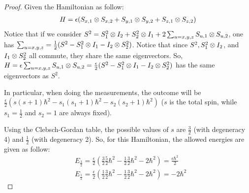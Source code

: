 \documentclass{article}
\begin{document}
\begin{proof}
    Given the Hamiltonian as follow:
    \begin{align}
        H=\epsilon(S_{x,1}\otimes S_{x,2}+S_{y,1}\otimes S_{y,2}+S_{z,1}\otimes S_{z,2})
    \end{align}
    Notice that if we consider $S^2 = S_1^2\otimes I_2+S_2^2\otimes I_1 + 2\sum_{u=x,y,z}S_{u,1}\otimes S_{u,2}$, one has $\sum_{u=x,y,z} = \frac{1}{2}(S^2-S_1^2\otimes I_1-I_2\otimes S_2^2)$. Notice that since $S^2, S_1^2\otimes I_2$, and $I_1\otimes S_2^2$ all commute, they share the same eigenvectors. So, $H = \epsilon\sum_{u=x,y,z}S_{u,1}\otimes S_{u,2} = \frac{\epsilon}{2}(S^2-S_1^2\otimes I_1-I_2\otimes S_2^2)$ has the same eigenvectors as $S^2$.

    In particular, when doing the measurements, the outcome will be $\frac{\epsilon}{2}(s(s+1)\hbar^2 - s_1(s_1+1)\hbar^2-s_2(s_2+1)\hbar^2)$ ($s$ is the total spin, while $s_1=\frac{1}{2}$ and $s_2=1$ are always fixed).

    Using the Clebsch-Gordan table, the possible values of $s$ are $\frac{3}{2}$ (with degeneracy 4) and $\frac{1}{2}$ (with degeneracy 2). So, for this Hamiltonian, the allowed energies are given as follow:
    \begin{align}
        &E_{\frac{3}{2}} = \frac{\epsilon}{2}\left(\frac{3}{2}\frac{5}{2}\hbar^2 - \frac{1}{2}\frac{3}{2}\hbar^2 - 2\hbar^2\right)=\frac{\epsilon\hbar^2}{2}\\
        &E_{\frac{1}{2}} = \frac{\epsilon}{2}\left(\frac{1}{2}\frac{3}{2}\hbar^2 - \frac{1}{2}\frac{3}{2}\hbar^2 - 2\hbar^2\right)=-2\hbar^2
    \end{align}


\end{proof}
\end{document}
